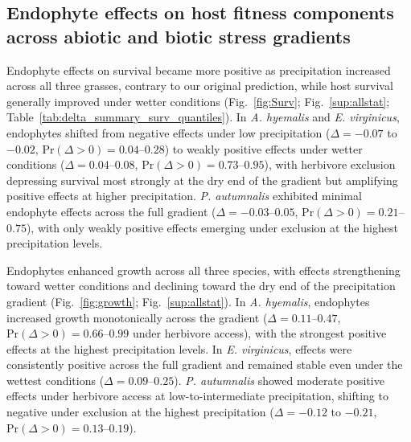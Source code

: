 \documentclass[12pt]{article}\usepackage[]{graphicx}\usepackage[dvipsnames]{xcolor}
\begin{document}
\subsection*{Endophyte effects on host fitness components across abiotic and biotic stress gradients}
Endophyte effects on survival became more positive as precipitation increased across all three grasses, contrary to our original prediction, while host survival generally improved under wetter conditions (Fig.~\ref{fig:Surv}; Fig.~\ref{sup:allstat}; Table~\ref{tab:delta_summary_surv_quantiles}).
In \textit{A. hyemalis} and \textit{E. virginicus}, endophytes shifted from negative effects under low precipitation ($\Delta = -0.07$ to $-0.02$, $\mathrm{Pr}(\Delta>0) = 0.04$--$0.28$) to weakly positive effects under wetter conditions ($\Delta = 0.04$--$0.08$, $\mathrm{Pr}(\Delta>0) = 0.73$--$0.95$), with herbivore exclusion depressing survival most strongly at the dry end of the gradient but amplifying positive effects at higher precipitation.
\textit{P. autumnalis} exhibited minimal endophyte effects across the full gradient ($\Delta = -0.03$--$0.05$, $\mathrm{Pr}(\Delta>0) = 0.21$--$0.75$), with only weakly positive effects emerging under exclusion at the highest precipitation levels.

Endophytes enhanced growth across all three species, with effects strengthening toward wetter conditions and declining toward the dry end of the precipitation gradient (Fig.~\ref{fig:growth}; Fig.~\ref{sup:allstat}).
In \textit{A. hyemalis}, endophytes increased growth monotonically across the gradient ($\Delta = 0.11$--$0.47$, $\mathrm{Pr}(\Delta>0) = 0.66$--$0.99$ under herbivore access), with the strongest positive effects at the highest precipitation levels.
In \textit{E. virginicus}, effects were consistently positive across the full gradient and remained stable even under the wettest conditions ($\Delta = 0.09$--$0.25$).
\textit{P. autumnalis} showed moderate positive effects under herbivore access at low-to-intermediate precipitation, shifting to negative under exclusion at the highest precipitation ($\Delta = -0.12$ to $-0.21$, $\mathrm{Pr}(\Delta>0) = 0.13$--$0.19$).
\end{document}
